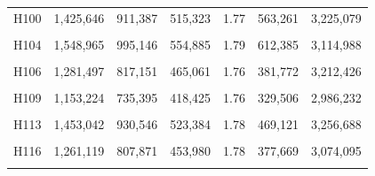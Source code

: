 \documentclass[
  a4paper,
  titlepage]{article}
\begin{document}
\begin{longtable}[t]{ccccccc}
H100 & 1,425,646 & 911,387 & 515,323 & 1.77 & 563,261 & 3,225,079\\
 
\cellcolor{gray!6}{H102} & \cellcolor{gray!6}{1,366,972} & \cellcolor{gray!6}{877,775} & \cellcolor{gray!6}{490,053} & \cellcolor{gray!6}{1.79} & \cellcolor{gray!6}{520,986} & \cellcolor{gray!6}{3,175,808}\\
 
H104 & 1,548,965 & 995,146 & 554,885 & 1.79 & 612,385 & 3,114,988\\
 
\cellcolor{gray!6}{H105} & \cellcolor{gray!6}{994,522} & \cellcolor{gray!6}{637,319} & \cellcolor{gray!6}{357,691} & \cellcolor{gray!6}{1.78} & \cellcolor{gray!6}{275,193} & \cellcolor{gray!6}{2,957,253}\\
 
H106 & 1,281,497 & 817,151 & 465,061 & 1.76 & 381,772 & 3,212,426\\
 
\cellcolor{gray!6}{H108} & \cellcolor{gray!6}{1,096,957} & \cellcolor{gray!6}{701,210} & \cellcolor{gray!6}{396,293} & \cellcolor{gray!6}{1.77} & \cellcolor{gray!6}{326,172} & \cellcolor{gray!6}{3,142,112}\\
 
H109 & 1,153,224 & 735,395 & 418,425 & 1.76 & 329,506 & 2,986,232\\
 
\cellcolor{gray!6}{H112} & \cellcolor{gray!6}{1,470,250} & \cellcolor{gray!6}{941,043} & \cellcolor{gray!6}{530,105} & \cellcolor{gray!6}{1.78} & \cellcolor{gray!6}{503,579} & \cellcolor{gray!6}{3,202,837}\\
 
H113 & 1,453,042 & 930,546 & 523,384 & 1.78 & 469,121 & 3,256,688\\
 
\cellcolor{gray!6}{H115} & \cellcolor{gray!6}{1,720,544} & \cellcolor{gray!6}{1,106,676} & \cellcolor{gray!6}{615,388} & \cellcolor{gray!6}{1.80} & \cellcolor{gray!6}{762,359} & \cellcolor{gray!6}{3,288,920}\\
 
H116 & 1,261,119 & 807,871 & 453,980 & 1.78 & 377,669 & 3,074,095\\
 
\cellcolor{gray!6}{H117} & \cellcolor{gray!6}{1,437,786} & \cellcolor{gray!6}{923,182} & \cellcolor{gray!6}{515,578} & \cellcolor{gray!6}{1.79} & \cellcolor{gray!6}{557,123} & \cellcolor{gray!6}{3,257,956}\\
 

\end{longtable}
\end{document}

